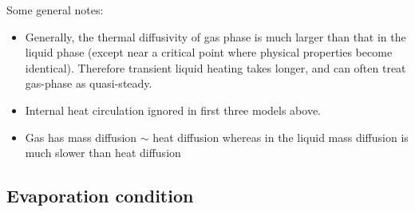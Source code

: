 \documentclass[12pt]{report}
\begin{document}
Some general notes:
\begin{itemize}
\item Generally, the thermal diffusivity of gas phase is much larger than that in the liquid phase (except near a critical point where physical properties become identical).
  Therefore transient liquid heating takes longer, and can often treat gas-phase as quasi-steady.
\item Internal heat circulation ignored in first three models above.
\item Gas has mass diffusion $\sim$ heat diffusion whereas in the liquid mass diffusion is much slower than heat diffusion
\end{itemize}


\subsection{Evaporation condition}
\end{document}
